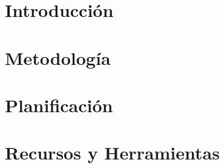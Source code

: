 \section{Introducción}


\section{Metodología}


\section{Planificación}


\newpage
\section{Recursos y Herramientas}


